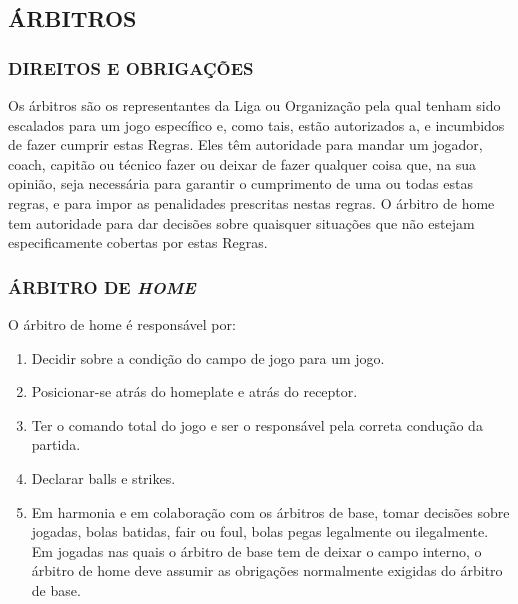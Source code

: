 \begin{multicols}{2}
	\subsection{\'ARBITROS} 
	\subsubsection{DIREITOS E OBRIGA\c{C}\~OES} 
	Os \'arbitros s\~ao os representantes da Liga ou Organiza\c{c}\~ao pela qual tenham sido escalados para um jogo espec\'ifico e, como tais, est\~ao autorizados a, e incumbidos de fazer cumprir estas Regras. Eles t\^em autoridade para mandar um jogador, \gls{coach}, capit\~ao ou t\'ecnico fazer ou deixar de fazer qualquer coisa que, na sua opini\~ao, seja necess\'aria para garantir o cumprimento de uma ou todas estas regras, e para impor as penalidades prescritas nestas regras. O \'arbitro de \gls{home} tem autoridade para dar decis\~oes sobre quaisquer situa\c{c}\~oes que n\~ao estejam especificamente cobertas por estas Regras. 
	
	\subsubsection{\'ARBITRO DE \textit{HOME} }
	O \'arbitro de \gls{home} \'e respons\'avel por: 
	
	\begin{enumerate}[label=\alph*)]
		\item Decidir sobre a condi\c{c}\~ao do campo de jogo para um jogo. 
		
		\item  Posicionar-se atr\'as do \gls{homeplate} e atr\'as do receptor. 
		
		\item  Ter o comando total do jogo e ser o respons\'avel pela correta condu\c{c}\~ao da partida. 
		
		\item  Declarar \glspl{ball} e \glspl{strike}. 
		
		\item  Em harmonia e em colabora\c{c}\~ao com os \'arbitros de base, tomar decis\~oes sobre jogadas, bolas batidas, \gls{fair} ou \gls{foul}, bolas pegas legalmente ou ilegalmente. Em jogadas nas quais o \'arbitro de base tem de deixar o campo interno, o \'arbitro de \gls{home} deve assumir as obriga\c{c}\~oes normalmente exigidas do \'arbitro de base. 
		

\end{enumerate}
\end{multicols}
